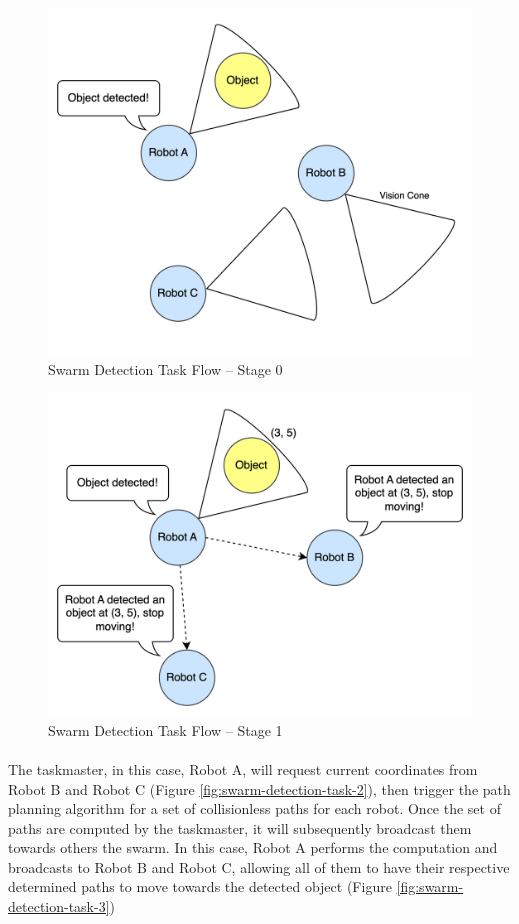 \begin{figure} [H]
    \centering
    \includegraphics[width=0.6\linewidth]{assets/images/communication/swarm-detection-task-flow-0.png}
    \caption{Swarm Detection Task Flow -- Stage 0}
    \label{fig:swarm-detection-task-0}
\end{figure}

\begin{figure} [H]
    \centering
    \includegraphics[width=0.6\linewidth]{assets/images/communication/swarm-detection-task-flow-1.png}
    \caption{Swarm Detection Task Flow -- Stage 1}
    \label{fig:swarm-detection-task-1}
\end{figure}

\paragraph*{}
The taskmaster, in this case, Robot A, will request current coordinates from Robot B and Robot C (Figure \ref{fig:swarm-detection-task-2}), then trigger the path planning algorithm for a set of collisionless paths for each robot. Once the set of paths are computed by the taskmaster, it will subsequently broadcast them towards others the swarm. In this case, Robot A performs the computation and broadcasts to Robot B and Robot C, allowing all of them to have their respective determined paths to move towards the detected object (Figure \ref{fig:swarm-detection-task-3})

